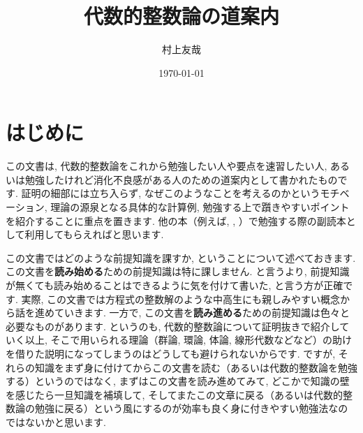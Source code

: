 \documentclass[11pt,b5paper,oneside,titlepage,lualatex]{ltjsreport}
\begin{document}

\title{代数的整数論の道案内}
\author{村上友哉}
\date{\today}
\maketitle



\chapter*{はじめに} \label{chap:intro}


この文書は, 代数的整数論をこれから勉強したい人や要点を速習したい人, あるいは勉強したけれど消化不良感がある人のための道案内として書かれたものです. 
証明の細部には立ち入らず, なぜこのようなことを考えるのかというモチベーション, 理論の源泉となる具体的な計算例, 勉強する上で躓きやすいポイントを紹介することに重点を置きます. 
他の本（例えば\cite{Yukie1}, \cite{Yukie2}, \cite{Neu}）で勉強する際の副読本として利用してもらえればと思います. 

この文書ではどのような前提知識を課すか, ということについて述べておきます. 
この文書を\textbf{読み始める}ための前提知識は特に課しません. 
と言うより, 前提知識が無くても読み始めることはできるように気を付けて書いた, と言う方が正確です. 
実際, この文書では方程式の整数解のような中高生にも親しみやすい概念から話を進めていきます. 
一方で, この文書を\textbf{読み進める}ための前提知識は色々と必要なものがあります. 
というのも, 代数的整数論について証明抜きで紹介していく以上, そこで用いられる理論（群論, 環論, 体論, 線形代数などなど）の助けを借りた説明になってしまうのはどうしても避けられないからです. 
ですが, それらの知識をまず身に付けてからこの文書を読む（あるいは代数的整数論を勉強する）というのではなく, まずはこの文書を読み進めてみて, どこかで知識の壁を感じたら一旦知識を補填して, そしてまたこの文章に戻る（あるいは代数的整数論の勉強に戻る）という風にするのが効率も良く身に付きやすい勉強法なのではないかと思います. 


\begin{quote}
	\centering
	[工事中]
\end{quote}


\end{document}
